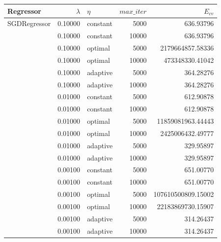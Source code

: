 \documentclass[a4paper, 20pt]{article}
\begin{document}
\begin{table}[h!]
  \centering
\begin{tabular}{lrlrr}
Regressor                        & $\lambda$ & $\eta$   & $max\_iter$ & $E_{cv}$                \\ \hline
SGDRegressor                     & 0.10000   & constant & 5000        & 636.93796          \\
                                 & 0.10000   & constant & 10000       & 636.93796          \\
                                 & 0.10000   & optimal  & 5000        & 2179664857.58336   \\
                                 & 0.10000   & optimal  & 10000       & 473348330.41042    \\
                                 & 0.10000   & adaptive & 5000        & 364.28276          \\
                                 & 0.10000   & adaptive & 10000       & 364.28276          \\
                                 & 0.01000   & constant & 5000        & 612.90878          \\
                                 & 0.01000   & constant & 10000       & 612.90878          \\
                                 & 0.01000   & optimal  & 5000        & 11859081963.44443  \\
                                 & 0.01000   & optimal  & 10000       & 2425006432.49777   \\
                                 & 0.01000   & adaptive & 5000        & 329.95897          \\
                                 & 0.01000   & adaptive & 10000       & 329.95897          \\
                                 & 0.00100   & constant & 5000        & 651.00770          \\
                                 & 0.00100   & constant & 10000       & 651.00770          \\
                                 & 0.00100   & optimal  & 5000        & 107610500809.15002 \\
                                 & 0.00100   & optimal  & 10000       & 22183869730.15907  \\
                                 & 0.00100   & adaptive & 5000        & 314.26437          \\
                                 & 0.00100   & adaptive & 10000       & 314.26437          \\

\end{tabular}
\end{table}
\end{document}
